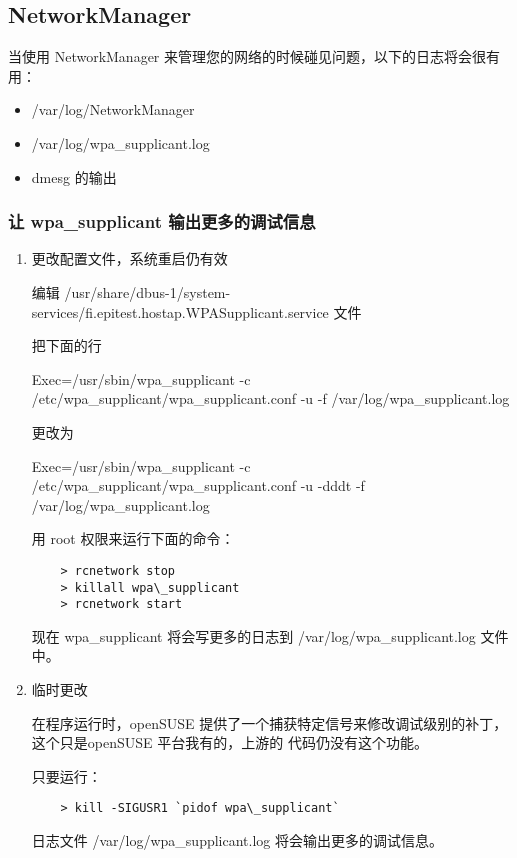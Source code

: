 \subsection{NetworkManager}
当使用 NetworkManager 来管理您的网络的时候碰见问题，以下的日志将会很有用：
\begin{itemize}
\item /var/log/NetworkManager
\item /var/log/wpa\_supplicant.log
\item dmesg 的输出
\end{itemize}

\subsubsection{让 wpa\_supplicant 输出更多的调试信息}
\begin{enumerate}
\item 更改配置文件，系统重启仍有效

  编辑 /usr/share/dbus-1/system-services/fi.epitest.hostap.WPASupplicant.service 文件

  把下面的行

  Exec=/usr/sbin/wpa\_supplicant -c /etc/wpa\_supplicant/wpa\_supplicant.conf -u -f /var/log/wpa\_supplicant.log

  更改为

  Exec=/usr/sbin/wpa\_supplicant -c /etc/wpa\_supplicant/wpa\_supplicant.conf -u -dddt -f /var/log/wpa\_supplicant.log

  用 root 权限来运行下面的命令：
\begin{verbatim}
	> rcnetwork stop
	> killall wpa\_supplicant
	> rcnetwork start
\end{verbatim}

  现在 wpa\_supplicant 将会写更多的日志到 /var/log/wpa\_supplicant.log 文件中。

\item 临时更改

  在程序运行时，openSUSE 提供了一个捕获特定信号来修改调试级别的补丁，这个只是openSUSE 平台我有的，上游的
  代码仍没有这个功能。

  只要运行：
\begin{verbatim}
	> kill -SIGUSR1 `pidof wpa\_supplicant`
\end{verbatim}
  日志文件 /var/log/wpa\_supplicant.log 将会输出更多的调试信息。
\end{enumerate}
